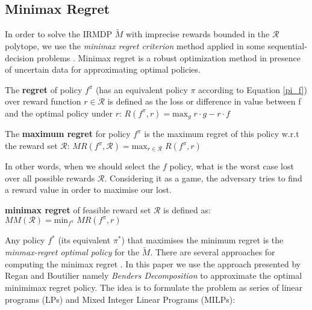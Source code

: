 \documentclass[runningheads,a4paper]{llncs}
\begin{document}
\subsection{Minimax Regret}\label{sec:minimax-regret}
In order to solve the IRMDP $\tilde{M}$ with imprecise rewards bounded in the $\mathcal{R}$ polytope, we use the \textit{minimax regret criterion} method applied in some sequential-decision problems \cite{Regan2009,Xu2009}. Minimax regret is a robust optimization method in presence of uncertain data for approximating optimal policies. 

\begin{definition}
The \textbf{regret} of policy $f^{\pi}$ (has an equivalent policy $\pi$ according to Equation \ref{pi_f}) over reward function $r \in \mathcal{R}$ is defined as the loss or difference in value between f and the optimal policy under $r$: $R(f^{\pi}, r) = \text{max}_{g} \; r \cdot g - r \cdot f$
\end{definition}

\begin{definition}
The \textbf{maximum regret} for policy $f^{\pi}$ is the maximum regret of this policy w.r.t the reward set $\mathcal{R}$: $MR(f^{\pi}, \mathcal{R}) = \text{max}_{r \in \mathcal{R}}\;R(f^{\pi},r)$ 
\end{definition}

In other words, when we should select the $f$ policy, what is the worst case lost over all possible rewards $\mathcal{R}$. Considering it as a game, the adversary tries to find a reward value in order to maximise our lost.  

\begin{definition}
\textbf{minimax regret} of feasible reward set $\mathcal{R}$ is defined as:\\ $MM(\mathcal{R}) = \text{min}_{f^{\pi}}\; MR(f^{\pi}, r)$
\end{definition}

Any policy $f^*$ (its equivalent $\pi^*$) that maximises the minimum regret is the \textit{minmax-regret optimal policy} for the $\tilde{M}$. There are several approaches for computing the minimax regret \cite{alizadeh2015,benavent2018,Regan2009,daSilva2011,Xu2009}. In this paper we use the approach presented by Regan and Boutilier \citep{Regan2009} namely \textit{Benders Decomposition} \cite{Benders1962} to approximate the optimal minimimax regret policy. The idea is to formulate the problem as series of linear programs (LPs) and Mixed Integer Linear Programs (MILPs):
\end{document}
